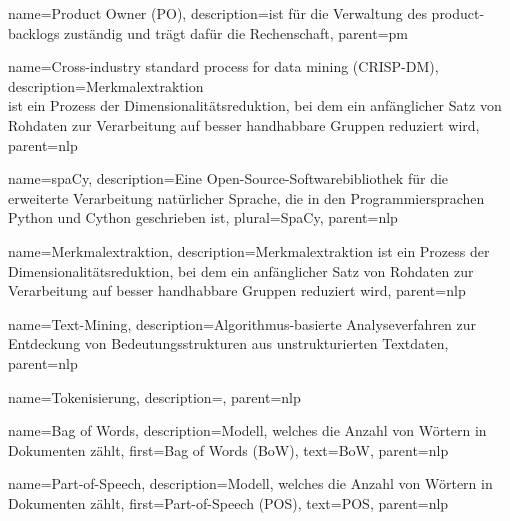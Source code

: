{
        name=Product Owner (PO),
        description={ist für die Verwaltung des \Glspl{product-backlog} zuständig und trägt dafür die Rechenschaft},
        parent=pm
}


{
        name=Cross-industry standard process for data mining (CRISP-DM),
        description={Merkmalextraktion\\ist ein Prozess der Dimensionalitätsreduktion, bei dem ein anfänglicher Satz von Rohdaten zur Verarbeitung auf besser handhabbare Gruppen reduziert wird},
        parent=nlp
}


{
        name=spaCy,
        description={Eine Open-Source-Softwarebibliothek für die erweiterte Verarbeitung natürlicher Sprache, die in den Programmiersprachen Python und Cython geschrieben ist},
        plural={SpaCy},
        parent=nlp
}

{
        name=Merkmalextraktion,
        description={Merkmalextraktion ist ein Prozess der Dimensionalitätsreduktion, bei dem ein anfänglicher Satz von Rohdaten zur Verarbeitung auf besser handhabbare Gruppen reduziert wird},
        parent=nlp
}

{
        name=Text-Mining,
        description={Algorithmus-basierte Analyseverfahren zur Entdeckung von Bedeutungsstrukturen aus unstrukturierten Textdaten},
        parent=nlp
}

{
        name=Tokenisierung,
        description={},
        parent=nlp
}

{
   name={Bag of Words},
   description={Modell, welches die Anzahl von Wörtern in Dokumenten zählt},
   first={Bag of Words (BoW)},           
   text={BoW},
        parent=nlp
} 

{
   name={Part-of-Speech},
   description={Modell, welches die Anzahl von Wörtern in Dokumenten zählt},
   first={Part-of-Speech (POS)},
   text={POS},
        parent=nlp
} 
